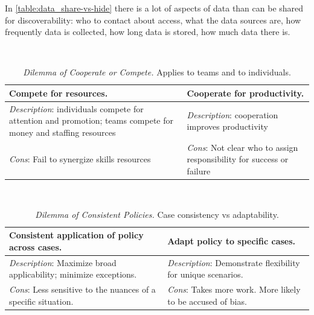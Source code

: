 In \ref{table:data_share-vs-hide} there is a lot of aspects of data than can be shared for discoverability: who to contact about access, what the data sources are, how frequently data is collected, how long data is stored, how much data there is.

\ \\

\begin{center}
\begin{table}[H] %
\begin{tabular}{ | m{\dilemmatablewidth}| m{\dilemmatablewidth} | } 
  \hline
  \textbf{Compete for resources.} &
  \textbf{Cooperate for productivity.} \\
  \hline
  \textit{Description}: individuals compete for attention and promotion; teams compete for money and staffing resources &
  \textit{Description}: cooperation improves productivity \\  
  \hline
  \textit{Cons}: Fail to synergize skills resources & 
  \textit{Cons}: Not clear who to assign responsibility for success or failure \\
  \hline
\end{tabular}
\caption{\textit{Dilemma of Cooperate or Compete.} Applies to teams and to individuals. 
}
\label{table:cooperate-vs-compete}
\end{table}
\end{center}

\ \\

\begin{center}
\begin{table}[H] %
\begin{tabular}{ | m{\dilemmatablewidth}| m{\dilemmatablewidth} | }
  \hline
  \textbf{Consistent application of policy across cases.} &
  \textbf{Adapt policy to specific cases.} \\
  \hline
  \textit{Description}: Maximize broad applicability; minimize exceptions. &
  \textit{Description}: Demonstrate flexibility for unique scenarios. \\  
  \hline
  \textit{Cons}: Less sensitive to the nuances of a specific situation. & 
  \textit{Cons}: Takes more work. More likely to be accused of bias. \\
  \hline
\end{tabular}
\caption{\textit{Dilemma of Consistent Policies.}
Case consistency vs adaptability.
}
\label{table:policy_consistency_across_cases}
\end{table}
\end{center}

